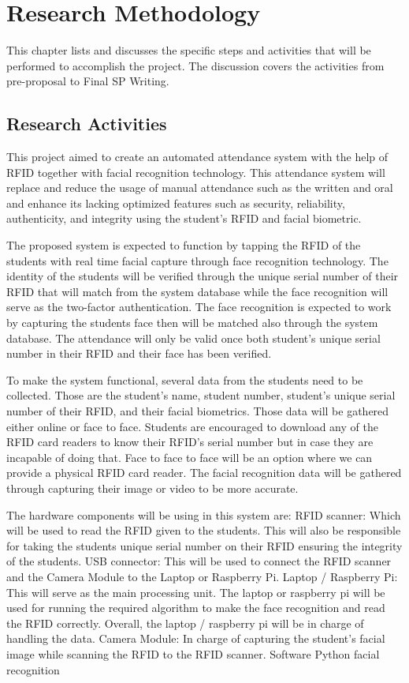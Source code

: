 \chapter{Research Methodology}
This chapter lists and discusses the specific steps and activities that will be performed  to accomplish the project. 
The discussion covers the activities from pre-proposal to Final SP Writing.

\section{Research Activities}
This project aimed to create an automated attendance system with the help of RFID together with facial recognition technology. This attendance system will replace and reduce the usage of manual attendance such as the written and oral and enhance its lacking optimized features such as security, reliability, authenticity, and integrity using the student’s RFID and facial biometric.

The proposed system is expected to function by tapping the RFID of the students with real time facial capture through face recognition technology. The identity of the students will be verified through the unique serial number of their RFID that will match from the system database while the face recognition will serve as the two-factor authentication. The face recognition is expected to work by capturing the students face then will be matched also through the system database. The attendance will only be valid once both student’s unique serial number in their RFID and their face has been verified.

To make the system functional, several data from the students need to be collected. Those are the student’s name, student number, student’s unique serial number of  their RFID, and their facial biometrics. Those data will be gathered either online or face to face. Students are encouraged to download any of the RFID card readers to know their RFID’s serial number but in case they are incapable of doing that. Face to face to face will be an option where we can provide a physical RFID card reader. The facial recognition data will be gathered through capturing their image or video to be more accurate. 

The hardware components will be using in this system are:
RFID scanner: Which will be used to read the RFID given to the students. This will also be responsible for taking the students unique serial number on their RFID ensuring the integrity of the students.
USB connector: This will be used to connect the RFID scanner and the Camera Module to the Laptop or Raspberry Pi.
Laptop / Raspberry Pi: This will serve as the main processing unit. The laptop or raspberry pi will be used for running the required algorithm to make the face recognition and read the RFID correctly. Overall, the laptop / raspberry pi will be in charge of handling the data.
Camera Module: In charge of capturing the student’s facial image while scanning the RFID to the RFID scanner. 
Software
Python facial recognition


